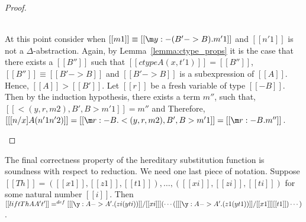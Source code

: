 \begin{proof}
\begin{itemize}
    \ \\
    At this point consider when $[[m1]] \equiv [[\m y:{-(B'->B)}.m'1]]$ and $[[n'1]]$ is not a 
    $\Delta$-abstraction.  Again, by Lemma~\ref{lemma:ctype_props} it is the case that 
    there exists a $[[B'']]$ such that $[[ctype A (x,t'1)]] = [[B'']]$, $[[B'']] \equiv [[B' -> B]]$ and
    $[[B' -> B]]$ is a subexpression of $[[A]]$.  Hence, $[[A]] > [[B']]$. Let $[[r]]$ be a fresh variable of type $[[{-B}]]$.    
    Then by the induction hypothesis, there exists a term $m''$, such that, $[[<(y,r,m2),B',B>m'1]] = m''$ and 
    Therefore, $[[ [n/x] A (n'1 n'2)]] = [[\m r:{-B}.<(y,r,m2),B',B>m'1]] = [[\m r:{-B}.m'']]$.
  \end{itemize}
\end{proof}
\noindent
The final correctness property of the hereditary substitution function is
soundness with respect to reduction.  We need one last piece of notation.
Suppose $[[Th]] = ([[x1]],[[z1]],[[t1]]),\ldots,([[xi]],[[zi]],[[ti]])$ for
some natural number $[[i]]$.
Then $[[lift Th A A' t']] =^{def} [ [[\y:A -> A'.(zi (y ti))]]/[[xi]] ](\cdots([ [[\y:A -> A'.(z1 (y t1))]]/[[x1]] ][[t1]])\cdots)$.

